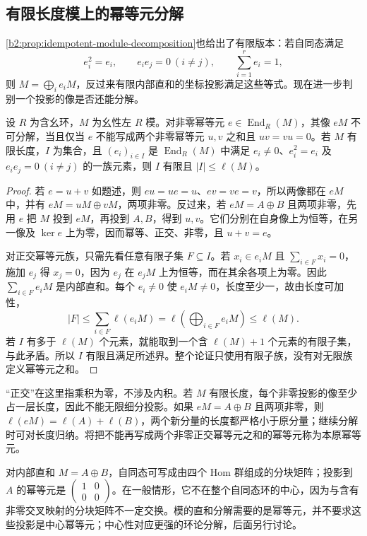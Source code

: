 \subsection{有限长度模上的幂等元分解}
\label{b2:subsec:1203:03}

\cref{b2:prop:idempotent-module-decomposition}也给出了有限版本：若自同态满足
\[
	e_i^2=e_i,\qquad e_ie_j=0\ (i\ne j),\qquad \sum_{i=1}^re_i=1,
\]
则 \(M=\bigoplus_i e_iM\)，反过来有限内部直和的坐标投影满足这些等式。现在进一步判别一个投影的像是否还能分解。

\begin{proposition}\label{b2:prop:orthogonal-idempotent-decomposition}
	设 \(R\) 为含幺环，\(M\) 为幺性左 \(R\) 模。对非零幂等元 \(e\in\operatorname{End}_R(M)\)，其像 \(eM\) 不可分解，当且仅当 \(e\) 不能写成两个非零幂等元 \(u,v\) 之和且 \(uv=vu=0\)。若 \(M\) 有限长度，\(I\) 为集合，且 \((e_i)_{i\in I}\) 是 \(\operatorname{End}_R(M)\) 中满足 \(e_i\ne0\)、\(e_i^2=e_i\) 及 \(e_ie_j=0\ (i\ne j)\) 的一族元素，则 \(I\) 有限且 \(|I|\le\ell(M)\)。
\end{proposition}
\begin{proof}
	若 \(e=u+v\) 如题述，则 \(eu=ue=u\)、\(ev=ve=v\)，所以两像都在 \(eM\) 中，并有 \(eM=uM\oplus vM\)，两项非零。反过来，若 \(eM=A\oplus B\) 且两项非零，先用 \(e\) 把 \(M\) 投到 \(eM\)，再投到 \(A,B\)，得到 \(u,v\)。它们分别在自身像上为恒等，在另一像及 \(\ker e\) 上为零，因而幂等、正交、非零，且 \(u+v=e\)。

	对正交幂等元族，只需先看任意有限子集 \(F\subseteq I\)。若 \(x_i\in e_iM\) 且 \(\sum_{i\in F}x_i=0\)，施加 \(e_j\) 得 \(x_j=0\)，因为 \(e_j\) 在 \(e_jM\) 上为恒等，而在其余各项上为零。因此 \(\sum_{i\in F}e_iM\) 是内部直和。每个 \(e_i\ne0\) 使 \(e_iM\ne0\)，长度至少一，故由长度可加性，
	\[
		|F|\le\sum_{i\in F}\ell(e_iM) =\ell\!\left(\bigoplus_{i\in F}e_iM\right) \le\ell(M).
	\]
	若 \(I\) 有多于 \(\ell(M)\) 个元素，就能取到一个含 \(\ell(M)+1\) 个元素的有限子集，与此矛盾。所以 \(I\) 有限且满足所述界。整个论证只使用有限子族，没有对无限族定义幂等元之和。
\end{proof}

“正交”在这里指乘积为零，不涉及内积。若 \(M\) 有限长度，每个非零投影的像至少占一层长度，因此不能无限细分投影。如果 \(eM=A\oplus B\) 且两项非零，则 \(\ell(eM)=\ell(A)+\ell(B)\)，两个新分量的长度都严格小于原分量；继续分解时可对长度归纳。将把不能再写成两个非零正交幂等元之和的幂等元称为本原幂等元。

\ProseParagraphBreak
对内部直和 \(M=A\oplus B\)，自同态可写成由四个 Hom 群组成的分块矩阵；投影到 \(A\) 的幂等元是 \(\begin{pmatrix}1&0\\0&0\end{pmatrix}\)。在一般情形，它不在整个自同态环的中心，因为与含有非零交叉映射的分块矩阵不一定交换。模的直和分解需要的是幂等元，并不要求这些投影是中心幂等元；中心性对应更强的环论分解，后面另行讨论。

